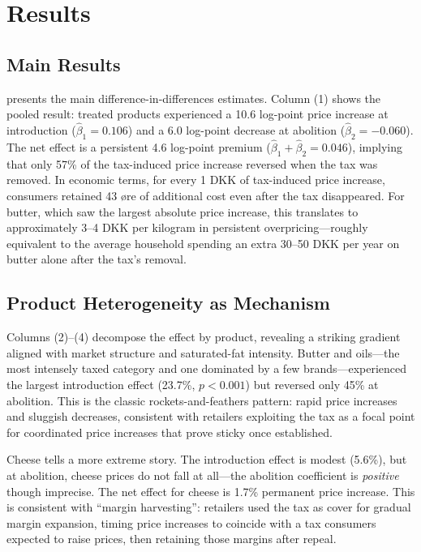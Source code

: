 \documentclass[12pt]{article}
\begin{document}
\section{Results}

\subsection{Main Results}



 presents the main difference-in-differences estimates. Column (1) shows the pooled result: treated products experienced a 10.6 log-point price increase at introduction ($\hat{\beta}_1 = 0.106$) and a 6.0 log-point decrease at abolition ($\hat{\beta}_2 = -0.060$). The net effect is a persistent 4.6 log-point premium ($\hat{\beta}_1 + \hat{\beta}_2 = 0.046$), implying that only 57\% of the tax-induced price increase reversed when the tax was removed. In economic terms, for every 1 DKK of tax-induced price increase, consumers retained 43 \o{}re of additional cost even after the tax disappeared. For butter, which saw the largest absolute price increase, this translates to approximately 3--4 DKK per kilogram in persistent overpricing---roughly equivalent to the average household spending an extra 30--50 DKK per year on butter alone after the tax's removal.

\subsection{Product Heterogeneity as Mechanism}

Columns (2)--(4) decompose the effect by product, revealing a striking gradient aligned with market structure and saturated-fat intensity. Butter and oils---the most intensely taxed category and one dominated by a few brands---experienced the largest introduction effect (23.7\%, $p < 0.001$) but reversed only 45\% at abolition. This is the classic rockets-and-feathers pattern: rapid price increases and sluggish decreases, consistent with retailers exploiting the tax as a focal point for coordinated price increases that prove sticky once established.

Cheese tells a more extreme story. The introduction effect is modest (5.6\%), but at abolition, cheese prices do not fall at all---the abolition coefficient is \textit{positive} though imprecise. The net effect for cheese is 1.7\% permanent price increase. This is consistent with ``margin harvesting'': retailers used the tax as cover for gradual margin expansion, timing price increases to coincide with a tax consumers expected to raise prices, then retaining those margins after repeal.
\end{document}
